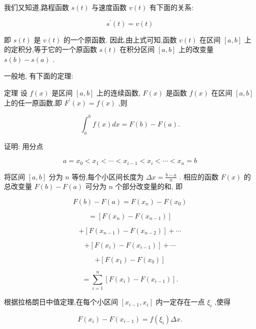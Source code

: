 \documentclass[10pt]{article}
\begin{document}
我们又知道,路程函数 \(s\left( t\right)\) 与速度函数 \(v\left( t\right)\) 有下面的关系:

\[
{s}^{\prime }\left( t\right) = v\left( t\right)
\]

即 \(s\left( t\right)\) 是 \(v\left( t\right)\) 的一个原函数. 因此,由上式可知,函数 \(v\left( t\right)\) 在区间 \(\left\lbrack {a,b}\right\rbrack\) 上的定积分,等于它的一个原函数 \(s\left( t\right)\) 在积分区间 \(\left\lbrack {a,b}\right\rbrack\) 上的改变量 \(s\left( b\right) - s\left( a\right)\) .

一般地, 有下面的定理:

定理 设 \(f\left( x\right)\) 是区间 \(\left\lbrack {a,b}\right\rbrack\) 上的连续函数, \(F\left( x\right)\) 是函数 \(f\left( x\right)\) 在区间 \(\left\lbrack {a,b}\right\rbrack\) 上的任一原函数,即 \({F}^{\prime }\left( x\right) = f\left( x\right)\) ,则

\[
{\int }_{a}^{b}f\left( x\right) {dx} = F\left( b\right) - F\left( a\right) .
\]

证明: 用分点

\[
a = {x}_{0} < {x}_{1} < \cdots < {x}_{i - 1} < {x}_{i} < \cdots < {x}_{n} = b
\]

将区间 \(\left\lbrack {a,b}\right\rbrack\) 分为 \(n\) 等份,每个小区间长度为 \({\Delta x} = \frac{b - a}{n}\) . 相应的函数 \(F\left( x\right)\) 的总改变量 \(F\left( b\right) - F\left( a\right)\) 可分为 \(n\) 个部分改变量的和, 即

\[
F\left( b\right) - F\left( a\right) = F\left( {x}_{n}\right) - F\left( {x}_{0}\right)
\]

\[
= \left\lbrack {F\left( {x}_{n}\right) - F\left( {x}_{n - 1}\right) }\right\rbrack
\]

\[
+ \left\lbrack {F\left( {x}_{n - 1}\right) - F\left( {x}_{n - 2}\right) }\right\rbrack + \cdots
\]

\[
+ \left\lbrack {F\left( {x}_{i}\right) - F\left( {x}_{i - 1}\right) }\right\rbrack + \cdots
\]

\[
+ \left\lbrack {F\left( {x}_{1}\right) - F\left( {x}_{0}\right) }\right\rbrack
\]

\[
= \mathop{\sum }\limits_{{i = 1}}^{n}\left\lbrack {F\left( {x}_{i}\right) - F\left( {x}_{i - 1}\right) }\right\rbrack \text{.} \tag{1}
\]

根据拉格朗日中值定理,在每个小区间 \(\left\lbrack {{x}_{i - 1},{x}_{i}}\right\rbrack\) 内一定存在一点 \({\xi }_{i}\) ,使得

\[
F\left( {x}_{i}\right) - F\left( {x}_{i - 1}\right) = f\left( {\xi }_{i}\right) {\Delta x}. \tag{2}
\]
\end{document}
